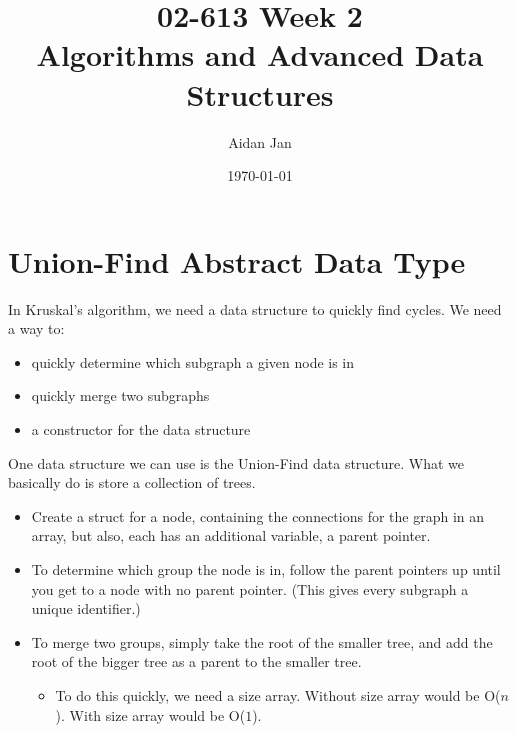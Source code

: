 \documentclass[10pt]{article}
\title{02-613 Week 2 \\ \large{Algorithms and Advanced Data Structures}}
\author{Aidan Jan}
\date{\today}
\begin{document}
\maketitle

\section*{Union-Find Abstract Data Type}
In Kruskal's algorithm, we need a data structure to quickly find cycles.  We need a way to:
\begin{itemize}
    \item quickly determine which subgraph a given node is in
    \item quickly merge two subgraphs
    \item a constructor for the data structure
\end{itemize}
One data structure we can use is the Union-Find data structure.  What we basically do is store a collection of trees.
\begin{itemize}
    \item Create a struct for a node, containing the connections for the graph in an array, but also, each has an additional variable, a parent pointer.
    \item To determine which group the node is in, follow the parent pointers up until you get to a node with no parent pointer.  (This gives every subgraph a unique identifier.)
    \item To merge two groups, simply take the root of the smaller tree, and add the root of the bigger tree as a parent to the smaller tree.
    \begin{itemize}
        \item To do this quickly, we need a size array.  Without size array would be O($n$).  With size array would be O($1$).
    \end{itemize}
\end{itemize}
\end{document}
